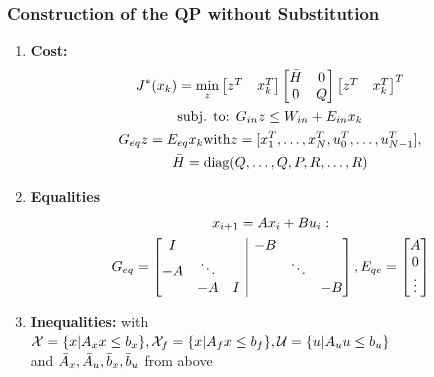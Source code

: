 \subsubsection{Construction of the QP without Substitution}
\begin{enumerate}
    \item \textbf{Cost:}\begin{gather*}
        J^*(x_k) =  \underset{z}{\textrm{min}}\begin{bmatrix}
        z^T & x_k^T
        \end{bmatrix} \begin{bmatrix}
        \Bar{H} & 0 \\ 0& Q
        \end{bmatrix} \begin{bmatrix}
        z^T & x_k^T
        \end{bmatrix}^T\\ \textrm{subj. to: } G_{in}z \leq W_{in} + E_{in}x_k\\
        G_{eq}z = E_{eq}x_k \textrm{with} z = [x_1^T, \dotsc, x_N^T, u_0^T, \dotsc, u_{N-1}^T],\\\Bar{H} = \textrm{diag}(Q,\dotsc,Q,P,R,\dotsc, R)
    \end{gather*}
        \item \textbf{Equalities} \begin{gather*}
            x_{i+1} = Ax_i+Bu_i:\\
            G_{eq} = \begin{bmatrix}
            \begin{array}{@{}ccc|ccc@{}}
            I & & &-B & & \\
            -A & \ddots & & &\ddots & \\
            & -A & I & & &-B 
            \end{array}
            \end{bmatrix}, E_{qe} = \begin{bmatrix}
            A\\ 0\\ \vdots
            \end{bmatrix}
        \end{gather*}
    \item \textbf{Inequalities: }with $\mathcal{X} = \{x|A_x x\leq b_x\},\\ \mathcal{X}_f = \{x|A_fx\leq b_f\}, \mathcal{U}= \{u|A_u u \leq b_u\}$\\ 
    and $\Bar{A}_x,\Bar{A}_u,\Bar{b}_x,\Bar{b}_u $ from above 
    \begin{gather*}

\end{gather*}
\end{enumerate}
